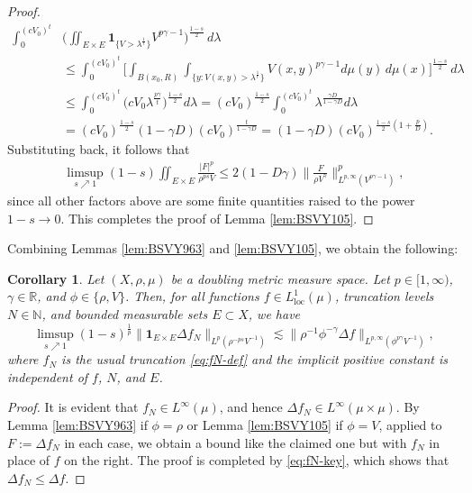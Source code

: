 \documentclass[11pt]{amsart}
\newtheorem{corollary}[theorem]{Corollary}
\theoremstyle{definition}
\theoremstyle{remark}
\numberwithin{equation}{section}
\newcommand{\Norm}[2]{\|#1\|_{#2}}
\newcommand{\BNorm}[2]{\Big\|#1\Big\|_{#2}}
\begin{document}
\begin{proof}
\begin{equation*}
\begin{split}
  \int_0^{(cV_0)^t} &\Big(\iint_{E\times E} \mathbf{1}_{\{V>\lambda^{\frac 1t}\}}
  V^{p\gamma-1}\Big)^{\frac{1-s}{2}}\,d\lambda   \\
  &\leq \int_0^{(cV_0)^t} \Big[\int_{B(x_0,R)}\int_{\{y:V(x,y)>\lambda^{\frac 1t}\}}
  V(x,y)^{p\gamma-1}d\mu(y)\,d\mu(x)
  \Big]^{\frac{1-s}{2}}\,d\lambda   \\
  &\leq \int_0^{(cV_0)^t} \big( cV_0
  \lambda^{\frac{p\gamma}{t}}\big)^{\frac{1-s}{2}}d\lambda
  = (cV_0)^{\frac{1-s}{2}} \int_0^{(cV_0)^t} \lambda^{\frac{\gamma D}{1-\gamma D}}d\lambda
  \\
  &=(cV_0)^{\frac{1-s}{2}}(1-\gamma D)(cV_0)^{\frac{t}{1-\gamma D}}
 =(1-\gamma D)(cV_0)^{\frac{1-s}{2}(1+\frac{p}{D})}.
\end{split}
\end{equation*}
Substituting back, it follows that
\begin{align*}
\limsup_{s\nearrow 1}(1-s)\iint_{E\times E}
     \frac{|F|^p}{\rho^{ps}V}
   \leq2(1-D\gamma)\BNorm{\frac{F}{\rho V^\gamma}}{
L^{p,\infty} (V^{p\gamma-1})}^p,
\end{align*}
since all other factors above are some finite quantities raised to the power $1-s\to 0$.
This completes the proof of Lemma \ref{lem:BSVY105}.
\end{proof}

Combining Lemmas \ref{lem:BSVY963} and \ref{lem:BSVY105}, we obtain the following:

\begin{corollary}\label{cor:DMS}
Let $(X,\rho,\mu)$ be a doubling metric measure space.
Let $p\in[1,\infty)$, $\gamma\in\mathbb R$, and $\phi\in\{\rho,V\}$. Then, for all functions
$f\in L^1_{\mathrm{loc}}(\mu)$, truncation levels $N\in\mathbb N$, and bounded measurable
sets $E\subset X$, we have
\begin{equation*}
  \limsup_{s\nearrow 1}(1-s)^{\frac1p}\Norm{\mathbf{1}_{E\times E}\Delta
  f_N}{L^p(\rho^{-ps}V^{-1})}
  \lesssim\Norm{\rho^{-1}\phi^{-\gamma}\Delta f}{L^{p,\infty}(\phi^{p\gamma}V^{-1})},
\end{equation*}
where $f_N$ is the usual truncation \eqref{eq:fN-def} and the implicit
positive constant is independent of $f$, $N$, and $E$.
\end{corollary}

\begin{proof}
It is evident that $f_N\in L^\infty(\mu)$, and hence $\Delta f_N\in L^\infty(\mu\times\mu)$.
By Lemma \ref{lem:BSVY963} if $\phi=\rho$ or Lemma \ref{lem:BSVY105} if $\phi=V$, applied to
$F:=\Delta f_N$ in each case, we obtain a bound like the claimed one but with $f_N$ in place
of $f$ on the right. The proof is completed by \eqref{eq:fN-key}, which shows that $\Delta
f_N\leq\Delta f$.
\end{proof}
\end{document}
